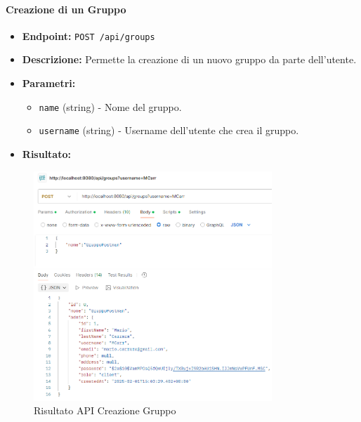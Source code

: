 \paragraph{Creazione di un Gruppo}
\begin{itemize}
    \item \textbf{Endpoint:} \texttt{POST /api/groups}
    \item \textbf{Descrizione:} Permette la creazione di un nuovo gruppo da parte dell'utente.
    \item \textbf{Parametri:}
    \begin{itemize}
        \item \texttt{name} (string) - Nome del gruppo.
        \item \texttt{username} (string) - Username dell'utente che crea il gruppo.
    \end{itemize}
    \item \textbf{Risultato:}
\end{itemize}
\begin{figure}[H]
    \centering
    \includegraphics[width=0.8\textwidth]{images/CreateGroupAPI.png}
    \caption{Risultato API Creazione Gruppo}
    \label{fig:api_create_group}
\end{figure}

